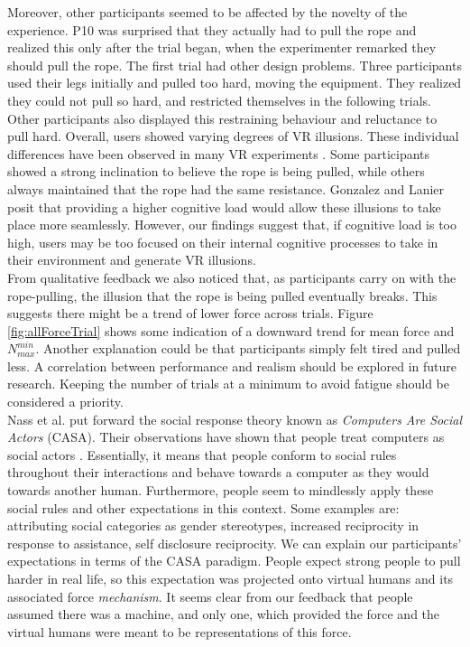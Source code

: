 Moreover, other participants  seemed to be affected by the novelty of the experience. P10 was surprised that they actually had to pull the rope and realized this only after the trial began, when the experimenter remarked they should pull the rope. The first trial had other design problems. Three participants used their legs initially and pulled too hard, moving the equipment. They realized they could not pull so hard, and restricted themselves in the following trials. Other participants also displayed this restraining behaviour and reluctance to pull hard. Overall, users showed varying degrees of VR illusions. These individual differences have been observed in many VR experiments \cite{gonzalez2017model}. Some participants showed a strong inclination to believe the rope is being pulled, while others always maintained that the rope had the same resistance. Gonzalez and Lanier posit that providing a higher cognitive load would allow these illusions to take place more seamlessly. However, our findings suggest that, if cognitive load is too high, users may be too focused on their internal cognitive processes to take in their environment and generate VR illusions. 
\\
 From qualitative feedback we also noticed that, as participants carry on with the rope-pulling, the illusion that the rope is being pulled eventually breaks. This suggests there might be a trend of lower force across trials. Figure \ref{fig:allForceTrial} shows some indication of a downward trend for mean force and $N_{max}^{min}$. Another explanation could be that participants simply felt tired and pulled less. A correlation between performance and realism should be explored in future research. Keeping the number of trials at a minimum to avoid fatigue should be considered a priority. 
\\
Nass et al. put forward the social response theory known as \textit{Computers Are Social Actors} (CASA). Their observations have shown that people treat computers as social actors \cite{nass1994computers}. Essentially, it means that people conform to social rules throughout their interactions and behave towards a computer as they would towards another human. Furthermore, people seem to mindlessly apply these social rules and other expectations in this context. Some examples are: attributing social categories as gender stereotypes, increased reciprocity in response to assistance, self disclosure reciprocity. We can explain our participants' expectations in terms of the CASA paradigm. People expect strong people to pull harder in real life, so this expectation was projected onto virtual humans and its associated force \textit{mechanism}. It seems clear from our feedback that people assumed there was a machine, and only one, which provided the force and the virtual humans were meant to be representations of this force. 
